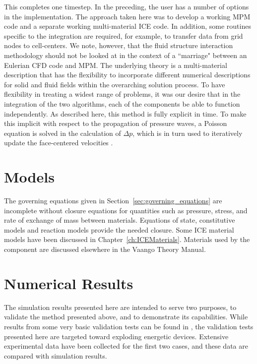 This completes one timestep.  In the preceding, the user has a number of
options in the implementation.  The approach taken here was to develop a 
working MPM code and a separate working multi-material ICE code.  In 
addition, some routines specific to the integration are required, for 
example, to transfer data from grid nodes to cell-centers.  We 
note, however, that the fluid structure interaction methodology should 
not be looked at in the context of a ``marriage" between an Eulerian CFD 
code and MPM.  The underlying theory is a multi-material description
that has the flexibility to incorporate different numerical descriptions for 
solid and fluid fields within the overarching solution process. 
To have flexibility in treating a widest range of problems, it was our 
desire that in the integration of the two algorithms, each of the components 
be able to function independently.  As described here, this method is fully 
explicit in time.  To make this implicit with respect to the propagation 
of pressure waves, a Poisson equation is solved in the calculation of 
$\Delta p$, which is in turn used to iteratively update the face-centered 
velocities \cite{Kashiwa1994a}.

\section{Models}\label{sec:models}

The governing equations given in Section~\ref{sec:governing_equations} are 
incomplete without closure equations for quantities such as pressure, stress, 
and rate of exchange of mass between materials.  Equations of 
state, constitutive models and reaction models provide
the needed closure.  Some ICE material models have been discussed in
Chapter~\ref{ch:ICEMaterials}.  Materials used by the \MPM component are
discussed elsewhere in the Vaango Theory Manual.

\section{Numerical Results}\label{sec:numerical_results}

  The simulation results presented here are intended to serve two purposes, to 
  validate the method presented above, and to demonstrate its 
  capabilities.  While results from some very basic validation tests can be 
  found in \cite{fourthmit}, the validation tests presented here are 
  targeted toward exploding energetic devices.  Extensive experimental data have
  been collected for the first two cases, and these data are compared with 
  simulation results.  
  
